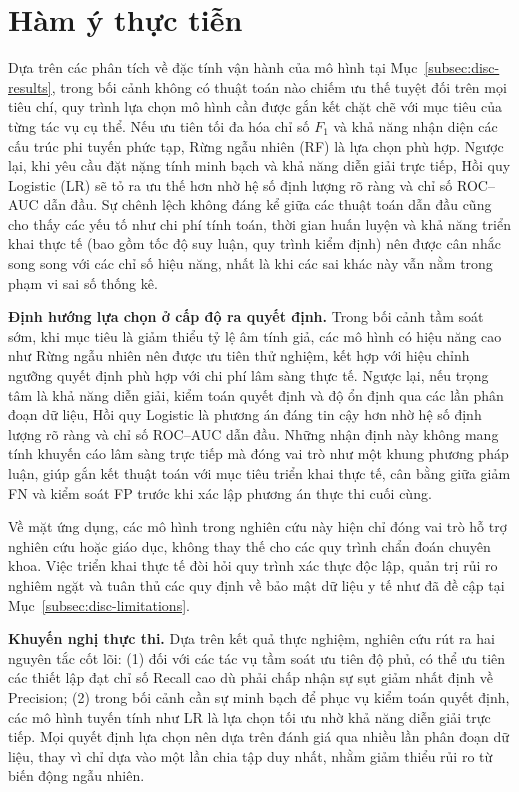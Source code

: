 \documentclass[14pt,a4paper]{extreport}
\begin{document}
\section{Hàm ý thực tiễn}
\label{subsec:disc-implications}


Dựa trên các phân tích về đặc tính vận hành của mô hình tại Mục~\ref{subsec:disc-results}, trong bối cảnh không có thuật toán nào chiếm ưu thế tuyệt đối trên mọi tiêu chí, quy trình lựa chọn mô hình cần được gắn kết chặt chẽ với mục tiêu của từng tác vụ cụ thể. Nếu ưu tiên tối đa hóa chỉ số $F_1$ và khả năng nhận diện các cấu trúc phi tuyến phức tạp, Rừng ngẫu nhiên (RF) là lựa chọn phù hợp. Ngược lại, khi yêu cầu đặt nặng tính minh bạch và khả năng diễn giải trực tiếp, Hồi quy Logistic (LR) sẽ tỏ ra ưu thế hơn nhờ hệ số định lượng rõ ràng và chỉ số ROC--AUC dẫn đầu. Sự chênh lệch không đáng kể giữa các thuật toán dẫn đầu cũng cho thấy các yếu tố như chi phí tính toán, thời gian huấn luyện và khả năng triển khai thực tế (bao gồm tốc độ suy luận, quy trình kiểm định) nên được cân nhắc song song với các chỉ số hiệu năng, nhất là khi các sai khác này vẫn nằm trong phạm vi sai số thống kê.

\textbf{Định hướng lựa chọn ở cấp độ ra quyết định.}
Trong bối cảnh tầm soát sớm, khi mục tiêu là giảm thiểu tỷ lệ âm tính giả, các mô hình có hiệu năng cao như Rừng ngẫu nhiên nên được ưu tiên thử nghiệm, kết hợp với hiệu chỉnh ngưỡng quyết định phù hợp với chi phí lâm sàng thực tế. Ngược lại, nếu trọng tâm là khả năng diễn giải, kiểm toán quyết định và độ ổn định qua các lần phân đoạn dữ liệu, Hồi quy Logistic là phương án đáng tin cậy hơn nhờ hệ số định lượng rõ ràng và chỉ số ROC--AUC dẫn đầu. Những nhận định này không mang tính khuyến cáo lâm sàng trực tiếp mà đóng vai trò như một khung phương pháp luận, giúp gắn kết thuật toán với mục tiêu triển khai thực tế, cân bằng giữa giảm FN và kiểm soát FP trước khi xác lập phương án thực thi cuối cùng.

Về mặt ứng dụng, các mô hình trong nghiên cứu này hiện chỉ đóng vai trò hỗ trợ nghiên cứu hoặc giáo dục, không thay thế cho các quy trình chẩn đoán chuyên khoa. Việc triển khai thực tế đòi hỏi quy trình xác thực độc lập, quản trị rủi ro nghiêm ngặt và tuân thủ các quy định về bảo mật dữ liệu y tế như đã đề cập tại Mục~\ref{subsec:disc-limitations}.

\textbf{Khuyến nghị thực thi.} Dựa trên kết quả thực nghiệm, nghiên cứu rút ra hai nguyên tắc cốt lõi: (1) đối với các tác vụ tầm soát ưu tiên độ phủ, có thể ưu tiên các thiết lập đạt chỉ số Recall cao dù phải chấp nhận sự sụt giảm nhất định về Precision; (2) trong bối cảnh cần sự minh bạch để phục vụ kiểm toán quyết định, các mô hình tuyến tính như LR là lựa chọn tối ưu nhờ khả năng diễn giải trực tiếp. Mọi quyết định lựa chọn nên dựa trên đánh giá qua nhiều lần phân đoạn dữ liệu, thay vì chỉ dựa vào một lần chia tập duy nhất, nhằm giảm thiểu rủi ro từ biến động ngẫu nhiên.
\end{document}
